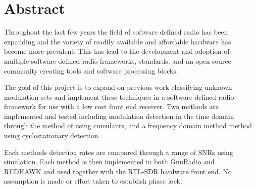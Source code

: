 \chapter{Abstract}

Throughout the last few years the field of software defined radio has been
expanding and the variety of readily available and affordable hardware has
become more prevalent.  This has lead to the development and adoption of
multiple software defined radio frameworks, standards, and an open source
community creating tools and software processing blocks.  

The goal of this project is to expand on previous work classifying unknown
modulation sets and implement these techniques in a software defined radio
framework for use with a low cost front end receiver.  Two methods are
implemented and tested including modulation detection in the time domain through
the method of using cumulants, and a frequency domain method method using
cyclostationary detection.

Each methods detection rates are compared through a range of SNRs using
simulation.  Each method is then implemented in both GnuRadio and REDHAWK and
used together with the RTL-SDR hardware front end.  No assumption is made or
effort taken to establish phase lock.
